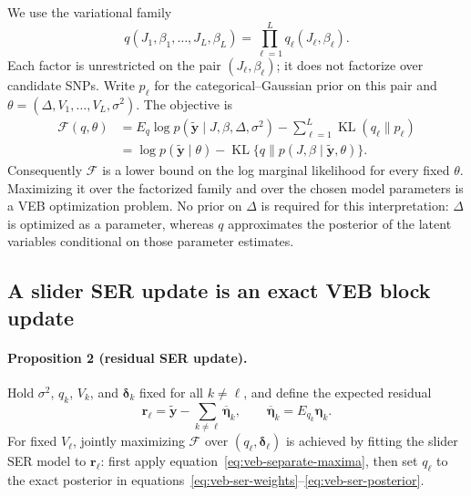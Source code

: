 We use the variational family
\begin{equation}
q(J_1,\beta_1,\ldots,J_L,\beta_L)
  =\prod_{\ell=1}^Lq_\ell(J_\ell,\beta_\ell).
\label{eq:veb-family}
\end{equation}
Each factor is unrestricted on the pair $(J_\ell,\beta_\ell)$;
it does not factorize over candidate SNPs. Write $p_\ell$ for the
categorical--Gaussian prior on this pair and
$\theta=(\Delta,V_1,\ldots,V_L,\sigma^2)$. The objective is
\begin{align}
\mathcal F(q,\theta)
 &=E_q\log p(\widetilde{\mathbf y}\mid J,\beta,\Delta,\sigma^2)
   -\sum_{\ell=1}^L\operatorname{KL}(q_\ell\|p_\ell)
\label{eq:veb-elbo}\\
 &=\log p(\widetilde{\mathbf y}\mid\theta)
   -\operatorname{KL}\{q\|p(J,\beta\mid
                           \widetilde{\mathbf y},\theta)\}.
\label{eq:veb-bound-identity}
\end{align}
Consequently $\mathcal F$ is a lower bound on the log marginal
likelihood for every fixed $\theta$. Maximizing it over the
factorized family and over the chosen model parameters is a VEB
optimization problem. No prior on $\Delta$ is required for this
interpretation: $\Delta$ is optimized as a parameter, whereas
$q$ approximates the posterior of the latent variables conditional
on those parameter estimates.

\subsection{A slider SER update is an exact VEB block update}

\paragraph{Proposition 2 (residual SER update).}
Hold $\sigma^2$, $q_k$, $V_k$, and $\boldsymbol\delta_k$ fixed
for all $k\neq\ell$, and define the expected residual
\begin{equation}
\mathbf r_\ell=\widetilde{\mathbf y}
       -\sum_{k\neq\ell}\overline{\boldsymbol\eta}_k,
\qquad
\overline{\boldsymbol\eta}_k=E_{q_k}\boldsymbol\eta_k.
\label{eq:veb-expected-residual}
\end{equation}
For fixed $V_\ell$, jointly maximizing $\mathcal F$ over
$(q_\ell,\boldsymbol\delta_\ell)$ is achieved by fitting the
slider SER model to $\mathbf r_\ell$: first apply
equation~\eqref{eq:veb-separate-maxima}, then set $q_\ell$ to the
exact posterior in equations~\eqref{eq:veb-ser-weights}--\eqref{eq:veb-ser-posterior}.


